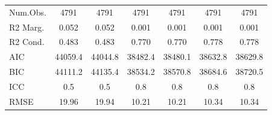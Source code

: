 \documentclass[]{report}
\begin{document}
\begin{table}
{\begin{tabular}[t]{lcccccc}
		\midrule
		Num.Obs. & \num{4791} & \num{4791} & \num{4791} & \num{4791} & \num{4791} & \num{4791}\\
		R2 Marg. & \num{0.052} & \num{0.052} & \num{0.001} & \num{0.001} & \num{0.001} & \num{0.001}\\
		R2 Cond. & \num{0.483} & \num{0.483} & \num{0.770} & \num{0.770} & \num{0.778} & \num{0.778}\\
		AIC & \num{44059.4} & \num{44044.8} & \num{38482.4} & \num{38480.1} & \num{38632.8} & \num{38629.8}\\
		BIC & \num{44111.2} & \num{44135.4} & \num{38534.2} & \num{38570.8} & \num{38684.6} & \num{38720.5}\\
		ICC & \num{0.5} & \num{0.5} & \num{0.8} & \num{0.8} & \num{0.8} & \num{0.8}\\
		RMSE & \num{19.96} & \num{19.94} & \num{10.21} & \num{10.21} & \num{10.34} & \num{10.34}\\
	 \hline


\end{tabular}}
\end{table}
\end{document}
